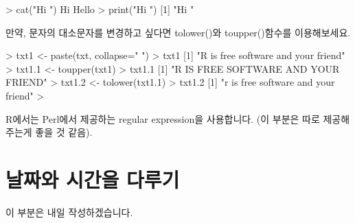 \begin{Schunk}
\begin{Soutput} 
> cat("Hi \nHello \n")
Hi 
Hello 
> print("Hi \nHello \n")
[1] "Hi \nHello \n"
\end{Soutput}
\end{Schunk}

만약, 문자의 대소문자를 변경하고 싶다면 tolower()와 toupper()함수를 이용해보세요.

\begin{Schunk}
\begin{Soutput} 
> txt1 <- paste(txt, collapse=" ")
> txt1
[1] "R is free software and your friend"
> txt1.1 <- toupper(txt1)
> txt1.1
[1] "R IS FREE SOFTWARE AND YOUR FRIEND"
> txt1.2 <- tolower(txt1.1)
> txt1.2
[1] "r is free software and your friend"
> 
\end{Soutput}
\end{Schunk}

R에서는 Perl에서 제공하는 regular expression을 사용합니다. 
(이 부분은 따로 제공해주는게 좋을 것 같음).
     


\section{날짜와 시간을 다루기}

이 부분은 내일 작성하겠습니다.

